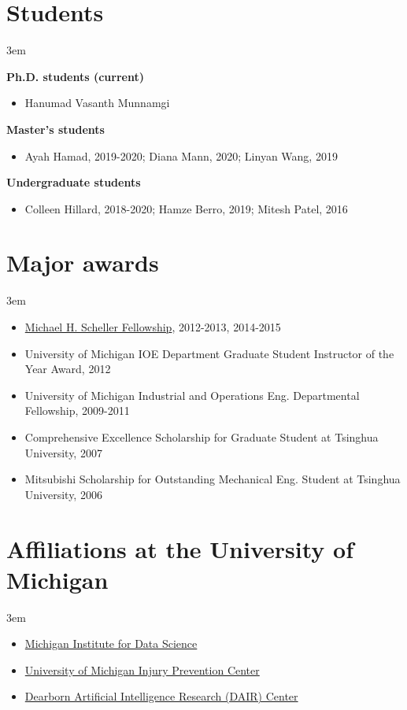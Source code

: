 \documentclass[11pt]{article}
\newenvironment{main}
{\begin{adjustwidth}{3em}{}}
{\end{adjustwidth}}
\begin{document}
\section*{Students}
\begin{main}

\textbf{Ph.D. students (current)}
\begin{itemize}
    \item Hanumad Vasanth Munnamgi
\end{itemize}

\textbf{Master’s students}
\begin{itemize}
    \item Ayah Hamad, 2019-2020; Diana Mann, 2020; Linyan Wang, 2019
\end{itemize}

\textbf{Undergraduate students}
\begin{itemize}
    \item Colleen Hillard, 2018-2020; Hamze Berro, 2019; Mitesh Patel, 2016
\end{itemize}


\end{main}
\section*{Major awards}
\begin{main}

\begin{itemize}
    \item \href{https://scholarships.engin.umich.edu/featured/michael-h-scheller-fund/}{Michael H. Scheller Fellowship}, 2012-2013, 2014-2015
    \item University of Michigan IOE Department Graduate Student Instructor of the Year Award, 2012
    \item University of Michigan Industrial and Operations Eng. Departmental Fellowship, 2009-2011
    \item Comprehensive Excellence Scholarship for Graduate Student at Tsinghua University, 2007
    \item Mitsubishi Scholarship for Outstanding Mechanical Eng. Student at Tsinghua University, 2006
\end{itemize}


\end{main}
\section*{Affiliations at the University of Michigan}
\begin{main}

\begin{itemize}
    \item \href{https://midas.umich.edu/}{Michigan Institute for Data Science}
    \item \href{https://injurycenter.umich.edu/}{University of Michigan Injury Prevention Center}
    \item \href{https://dair.iselab.us/}{Dearborn Artificial Intelligence Research (DAIR) Center}
\end{itemize}


\end{main}
\end{document}
